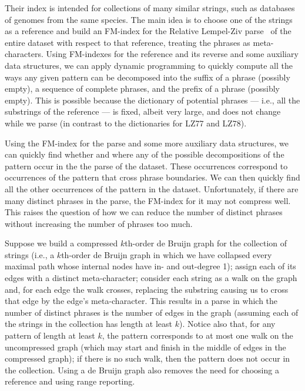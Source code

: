 \documentclass[a4paper,UKenglish]{lipics-v2016}
\begin{document}
Their index is intended for collections of many similar strings, such as databases of genomes from the same species.  The main idea is to choose one of the strings as a reference and build an FM-index for the Relative Lempel-Ziv parse~\cite{KPZ10} of the entire dataset with respect to that reference, treating the phrases as meta-characters.  Using FM-indexes for the reference and its reverse and some auxiliary data structures, we can apply dynamic programming to quickly compute all the ways any given pattern can be decomposed into the suffix of a phrase (possibly empty), a sequence of complete phrases, and the prefix of a phrase (possibly empty).  This is possible because the dictionary of potential phrases --- i.e., all the substrings of the reference --- is fixed, albeit very large, and does not change while we parse (in contrast to the dictionaries for LZ77 and LZ78).

Using the FM-index for the parse and some more auxiliary data structures, we can quickly find whether and where any of the possible decompositions of the pattern occur in the the parse of the dataset.  These occurrences correspond to occurrences of the pattern that cross phrase boundaries.  We can then quickly find all the other occurrences of the pattern in the dataset.  Unfortunately, if there are many distinct phrases in the parse, the FM-index for it may not compress well.  This raises the question of how we can reduce the number of distinct phrases without increasing the number of phrases too much.

Suppose we build a compressed $k$th-order de Bruijn graph for the collection of strings (i.e., a $k$th-order de Bruijn graph in which we have collapsed every maximal path whose internal nodes have in- and out-degree 1); assign each of its edges with a distinct meta-character; consider each string as a walk on the graph and, for each edge the walk crosses, replacing the substring causing us to cross that edge by the edge's meta-character.  This results in a parse in which the number of distinct phrases is the number of edges in the graph (assuming each of the strings in the collection has length at least $k$).  Notice also that, for any pattern of length at least $k$, the pattern corresponds to at most one walk on the uncompressed graph (which may start and finish in the middle of edges in the compressed graph); if there is no such walk, then the pattern does not occur in the collection.  Using a de Bruijn graph also removes the need for choosing a reference and using range reporting.
\end{document}
